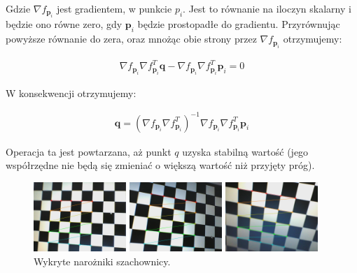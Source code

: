 \documentclass[oneside, eng]{mgr}
\newcommand{\bb}{\textbf}
\begin{document}
Gdzie $\nabla f_{\bb{p}_i}$ jest gradientem, w punkcie $p_i$. Jest to równanie na iloczyn skalarny i będzie ono równe zero, gdy $\bb{p}_i$ będzie prostopadłe do gradientu. Przyrównując powyższe równanie do zera, oraz mnożąc obie strony przez $\nabla f_{\bb{p}_i}$ otrzymujemy:

\begin{align*}
	\nabla f_{\bb{p}_i} \nabla f_{\bb{p}_i}^T \bb{q} - \nabla f_{\bb{p}_i} \nabla f_{\bb{p}_i}^T \bb{p}_i = 0
\end{align*}

W konsekwencji otrzymujemy:

\begin{align}
	\bb{q} = (\nabla f_{\bb{p}_i} \nabla f_{\bb{p}_i}^T)^{-1} \nabla f_{\bb{p}_i} \nabla f_{\bb{p}_i}^T \bb{p}_i
\end{align}

Operacja ta jest powtarzana, aż punkt $q$ uzyska stabilną wartość (jego współrzędne nie będą się zmieniać o większą wartość niż przyjęty próg).

\begin{figure}
\centering
		\begin{minipage}{3.5cm}
			\includegraphics[width=3.5cm]{left1.jpg}
		\end{minipage}
		\begin{minipage}{3.5cm}
			\includegraphics[width=3.5cm]{left10.jpg}
		\end{minipage}
		\begin{minipage}{3.5cm}
			\includegraphics[width=3.5cm]{left27.jpg}
		\end{minipage}
	\caption{Wykryte narożniki szachownicy. }
	\label{fig:corners}
\end{figure}
\end{document}
